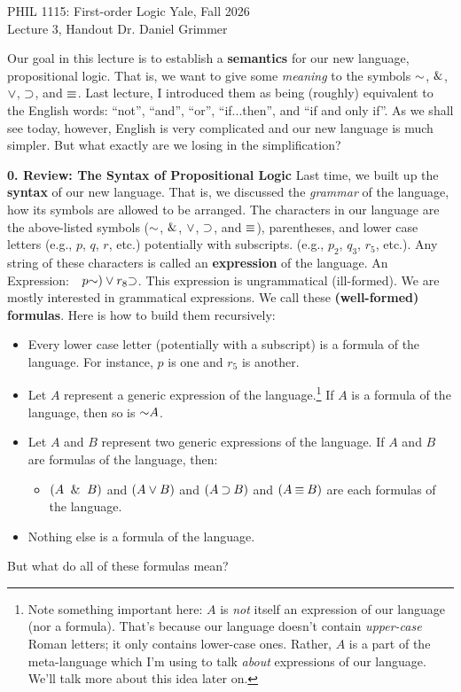 \documentclass[options]{philosophersimprint}
\theoremstyle{definition}
\begin{document}
PHIL 1115: First-order Logic \hfill Yale, Fall 2026\\
Lecture 3, Handout \hfill Dr. Daniel Grimmer

Our goal in this lecture is to establish a \textbf{semantics} for our new language, propositional logic. That is, we want to give some \textit{meaning} to the symbols $\mathord{\sim}$, $\mathbin{\&}$, $\mathbin{\vee}$, $\mathbin{\supset}$, and $\mathbin{\equiv}$. Last lecture, I introduced them as being (roughly) equivalent to the English words: ``not'', ``and'', ``or'', ``if...then'', and ``if and only if''. As we shall see today, however, English is very complicated and our new language is much simpler. But what exactly are we losing in the simplification?

\textbf{0. Review: The Syntax of Propositional Logic} Last time, we built up the \textbf{syntax} of our new language. That is, we discussed the \textit{grammar} of the language, how its symbols are allowed to be arranged. The characters in our language are the above-listed symbols ($\mathord{\sim}$, $\mathbin{\&}$, $\mathbin{\vee}$, $\mathbin{\supset}$, and $\mathbin{\equiv}$), parentheses, and lower case letters (e.g., $p$, $q$, $r$, etc.) potentially with subscripts. (e.g., $p_2$, $q_3$, $r_5$, etc.). Any string of these characters is called an \textbf{expression} of the language. An Expression:$\quad p\mathord{\sim})\mathbin{\vee} r_8\mathbin{\supset}$. This expression is ungrammatical (ill-formed). We are mostly interested in grammatical expressions. We call these \textbf{(well-formed) formulas}. Here is how to build them recursively:
\begin{itemize}
    \item[(i)] Every lower case letter (potentially with a subscript) is a formula of the language. For instance, $p$ is one and $r_5$ is another.
    \item[(ii)] Let $A$ represent a generic expression of the language.\footnote{Note something important here: $A$ is \textit{not} itself an expression of our language (nor a formula). That's because our language doesn't contain \textit{upper-case} Roman letters; it only contains lower-case ones. Rather, $A$ is a part of the meta-language which I'm using to talk \textit{about} expressions of our language. We'll talk more about this idea later on.} If $A$ is a formula of the language, then so is $\mathord{\sim} A$.
    \item[(iii)] Let $A$ and $B$ represent two generic expressions of the language. If $A$ and $B$ are formulas of the language, then: \begin{itemize}
        \item $(A \ \mathbin{\&} \  B)$ and $(A \mathbin{\vee} B)$ and $(A \mathbin{\supset} B)$ and $(A \mathbin{\equiv} B)$ are each formulas of the language.
    \end{itemize}
    \item[(iv)] Nothing else is a formula of the language.
\end{itemize}
But what do all of these formulas mean?
\end{document}
